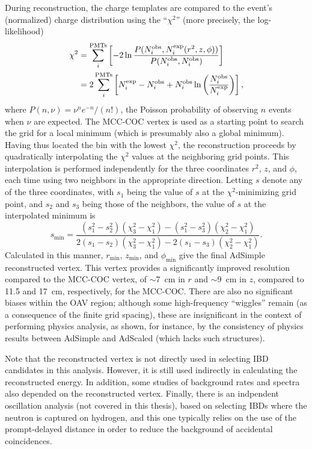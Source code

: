 \documentclass[../thesis.tex]{subfiles}
\begin{document}
During reconstruction, the charge templates are compared to the event's
(normalized) charge distribution using the ``$\chi^2$'' (more precisely, the
log-likelihood)
\begin{align*}
  \chi^2 &= \sum_i^{\mathrm{PMTs}}\left[ -2 \ln \frac{P(N_i^{\mathrm{obs}}, N_i^{\mathrm{exp}}(r^2, z, \phi))}
           {P(N_i^{\mathrm{obs}}, N_i^{\mathrm{obs}})} \right] \\
         &= 2 \sum_i^{\mathrm{PMTs}} \left[ N_i^{\mathrm{exp}} - N_i^{\mathrm{obs}}+ N_i^{\mathrm{obs}} \ln \left( \frac{N_i^{\mathrm{obs}}}{N_i^{\mathrm{exp}}} \right) \right],
\end{align*}
where $P(n, \nu) = \nu^n e^{-n} / (n!)$, the Poisson probability of observing
$n$ events when $\nu$ are expected. The MCC-COC vertex is used as a starting
point to search the grid for a local minimum (which is presumably also a global
minimum). Having thus located the bin with the lowest $\chi^2$, the
reconstruction proceeds by quadratically interpolating the $\chi^2$ values at
the neighboring grid points. This interpolation is performed independently for
the three coordinates $r^2$, $z$, and $\phi$, each time using two neighbors in
the appropriate direction. Letting $s$ denote any of the three coordinates, with
$s_1$ being the value of $s$ at the $\chi^2$-minimizing grid point, and $s_2$
and $s_3$ being those of the neighbors, the value of $s$ at the interpolated
minimum is
\begin{equation*}
  s_{\mathrm{min}} = \frac{(s_1^2 - s_2^2)(\chi_3^2 - \chi_1^2) - (s_1^2 - s_3^2)(\chi_2^2 - \chi_1^2)}{2(s_1 - s_2)(\chi_3^2 - \chi_1^2) - 2(s_1 - s_3)(\chi_2^2 - \chi_1^2)}.
\end{equation*}
Calculated in this manner, $r_{\mathrm{min}}$, $z_{\mathrm{min}}$, and
$\phi_{\mathrm{min}}$ give the final AdSimple reconstructed vertex. This vertex
provides a significantly improved resolution compared to the MCC-COC vertex, of
$\sim$7~cm in $r$ and $\sim$9~cm in $z$, compared to 11.5 and 17~cm,
respectively, for the MCC-COC. There are also no significant biases within the
OAV region; although some high-frequency ``wiggles'' remain (as a consequence of
the finite grid spacing), these are insignificant in the context of performing
physics analysis, as shown, for instance, by the consistency of physics results
between AdSimple and AdScaled (which lacks such structures).

Note that the reconstructed vertex is not directly used in selecting IBD
candidates in this analysis. However, it is still used indirectly in calculating
the reconstructed energy. In addition, some studies of background rates and
spectra also depended on the reconstructed vertex. Finally, there is an
indpendent oscillation analysis (not covered in this thesis), based on selecting
IBDs where the neutron is captured on hydrogen, and this one typically relies on
the use of the prompt-delayed distance in order to reduce the background of
accidental coincidences.
\end{document}
